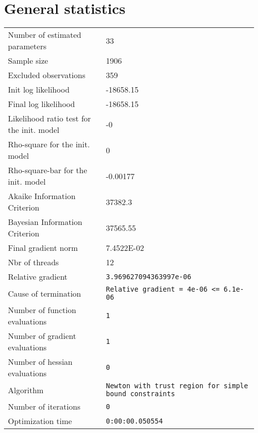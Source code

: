 



\section{General statistics}
\begin{tabular}{ll}
Number of estimated parameters & 33 \\
Sample size & 1906 \\
Excluded observations & 359 \\
Init log likelihood & -18658.15 \\
Final log likelihood & -18658.15 \\
Likelihood ratio test for the init. model & -0 \\
Rho-square for the init. model & 0 \\
Rho-square-bar for the init. model & -0.00177 \\
Akaike Information Criterion & 37382.3 \\
Bayesian Information Criterion & 37565.55 \\
Final gradient norm & 7.4522E-02 \\
Nbr of threads & 12 \\
Relative gradient & \verb$3.969627094363997e-06$ \\
Cause of termination & \verb$Relative gradient = 4e-06 <= 6.1e-06$ \\
Number of function evaluations & \verb$1$ \\
Number of gradient evaluations & \verb$1$ \\
Number of hessian evaluations & \verb$0$ \\
Algorithm & \verb$Newton with trust region for simple bound constraints$ \\
Number of iterations & \verb$0$ \\
Optimization time & \verb$0:00:00.050554$ \\
\end{tabular}

